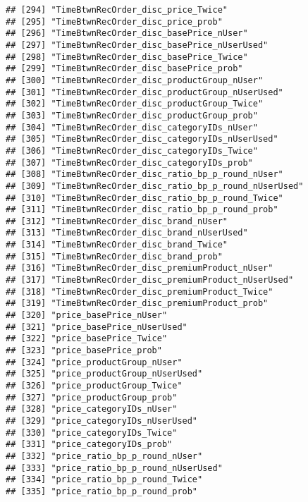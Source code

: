 \documentclass[10pt]{report}
\begin{document}
\begin{verbatim}
## [294] "TimeBtwnRecOrder_disc_price_Twice"                  
## [295] "TimeBtwnRecOrder_disc_price_prob"                   
## [296] "TimeBtwnRecOrder_disc_basePrice_nUser"              
## [297] "TimeBtwnRecOrder_disc_basePrice_nUserUsed"          
## [298] "TimeBtwnRecOrder_disc_basePrice_Twice"              
## [299] "TimeBtwnRecOrder_disc_basePrice_prob"               
## [300] "TimeBtwnRecOrder_disc_productGroup_nUser"           
## [301] "TimeBtwnRecOrder_disc_productGroup_nUserUsed"       
## [302] "TimeBtwnRecOrder_disc_productGroup_Twice"           
## [303] "TimeBtwnRecOrder_disc_productGroup_prob"            
## [304] "TimeBtwnRecOrder_disc_categoryIDs_nUser"            
## [305] "TimeBtwnRecOrder_disc_categoryIDs_nUserUsed"        
## [306] "TimeBtwnRecOrder_disc_categoryIDs_Twice"            
## [307] "TimeBtwnRecOrder_disc_categoryIDs_prob"             
## [308] "TimeBtwnRecOrder_disc_ratio_bp_p_round_nUser"       
## [309] "TimeBtwnRecOrder_disc_ratio_bp_p_round_nUserUsed"   
## [310] "TimeBtwnRecOrder_disc_ratio_bp_p_round_Twice"       
## [311] "TimeBtwnRecOrder_disc_ratio_bp_p_round_prob"        
## [312] "TimeBtwnRecOrder_disc_brand_nUser"                  
## [313] "TimeBtwnRecOrder_disc_brand_nUserUsed"              
## [314] "TimeBtwnRecOrder_disc_brand_Twice"                  
## [315] "TimeBtwnRecOrder_disc_brand_prob"                   
## [316] "TimeBtwnRecOrder_disc_premiumProduct_nUser"         
## [317] "TimeBtwnRecOrder_disc_premiumProduct_nUserUsed"     
## [318] "TimeBtwnRecOrder_disc_premiumProduct_Twice"         
## [319] "TimeBtwnRecOrder_disc_premiumProduct_prob"          
## [320] "price_basePrice_nUser"                              
## [321] "price_basePrice_nUserUsed"                          
## [322] "price_basePrice_Twice"                              
## [323] "price_basePrice_prob"                               
## [324] "price_productGroup_nUser"                           
## [325] "price_productGroup_nUserUsed"                       
## [326] "price_productGroup_Twice"                           
## [327] "price_productGroup_prob"                            
## [328] "price_categoryIDs_nUser"                            
## [329] "price_categoryIDs_nUserUsed"                        
## [330] "price_categoryIDs_Twice"                            
## [331] "price_categoryIDs_prob"                             
## [332] "price_ratio_bp_p_round_nUser"                       
## [333] "price_ratio_bp_p_round_nUserUsed"                   
## [334] "price_ratio_bp_p_round_Twice"                       
## [335] "price_ratio_bp_p_round_prob"                        

\end{verbatim}
\end{document}
